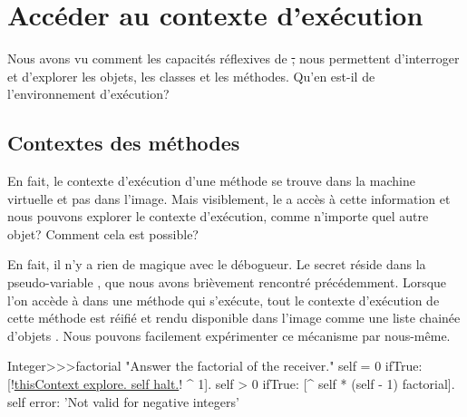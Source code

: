 \documentclass[a4paper,10pt,twoside]{book}
\begin{document}

\section{Accéder au contexte d'exécution}

Nous avons vu comment les capacités réflexives de \st, nous permettent d'interroger et d'explorer les objets, les classes et les méthodes. Qu'en est-il de l'environnement d'exécution?

\subsection{Contextes des méthodes}

En fait, le contexte d'exécution d'une méthode se trouve dans la machine virtuelle et pas dans l'image. Mais visiblement, le  a accès à cette information et nous pouvons explorer le contexte d'exécution, comme n'importe quel autre objet? Comment cela est possible?

En fait, il n'y a rien de magique avec le débogueur.
Le secret réside dans la pseudo-variable , que nous avons brièvement rencontré précédemment.
Lorsque l'on accède à  dans une méthode qui s'exécute, tout le contexte d'exécution de cette méthode est réifié et rendu disponible dans l'image comme une liste chainée d'objets .
Nous pouvons facilement expérimenter ce mécanisme par nous-même.

\begin{code}{}
Integer>>>factorial
	"Answer the factorial of the receiver."
	self = 0 ifTrue: [!\underline{thisContext explore. self halt.}! ^ 1].
	self > 0 ifTrue: [^ self * (self - 1) factorial].
	self error: 'Not valid for negative integers'
\end{code}

\end{document}
